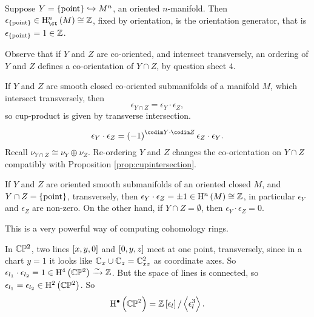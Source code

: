 \begin{example*}
Suppose $ Y = \pt \hookrightarrow M^n $, an oriented $ n $-manifold. Then $ \epsilon_{\pt} \in \Hc^n\br{M} \cong \ZZ $, fixed by orientation, is the orientation generator, that is $ \epsilon_{\pt} = 1 \in \ZZ $.
\end{example*}

Observe that if $ Y $ and $ Z $ are co-oriented, and intersect transversely, an ordering of $ Y $ and $ Z $ defines a co-orientation of $ Y \cap Z $, by question sheet $ 4 $.

\begin{proposition}
\label{prop:cupintersection}
If $ Y $ and $ Z $ are smooth closed co-oriented submanifolds of a manifold $ M $, which intersect transversely, then
$$ \epsilon_{Y \cap Z} = \epsilon_Y \cdot \epsilon_Z, $$
so cup-product is given by transverse intersection.
\end{proposition}

\begin{remark*}
$$ \epsilon_Y \cdot \epsilon_Z = \br{-1}^{\codim Y \cdot \codim Z}\epsilon_Z \cdot \epsilon_Y. $$
Recall $ \nu_{Y \cap Z} \cong \nu_Y \oplus \nu_Z $. Re-ordering $ Y $ and $ Z $ changes the co-orientation on $ Y \cap Z $ compatibly with Proposition \ref{prop:cupintersection}.
\end{remark*}

\begin{corollary}
If $ Y $ and $ Z $ are oriented smooth submanifolds of an oriented closed $ M $, and $ Y \cap Z = \pt $, transversely, then $ \epsilon_Y \cdot \epsilon_Z = \pm 1 \in \H^n\br{M} \cong \ZZ $, in particular $ \epsilon_Y $ and $ \epsilon_Z $ are non-zero. On the other hand, if $ Y \cap Z = \emptyset $, then $ \epsilon_Y \cdot \epsilon_Z = 0 $.
\end{corollary}

This is a very powerful way of computing cohomology rings.

\begin{example*}
In $ \mathbb{C}\mathbb{P}^2 $, two lines $ \sbr{x, y, 0} $ and $ \sbr{0, y, z} $ meet at one point, transversely, since in a chart $ y = 1 $ it looks like $ \mathbb{C}_x \cup \mathbb{C}_z = \mathbb{C}_{xz}^2 $ as coordinate axes. So $ \epsilon_{l_1} \cdot \epsilon_{l_2} = 1 \in \H^4\br{\CC\PP^2} \xrightarrow{\sim} \ZZ $. But the space of lines is connected, so $ \epsilon_{l_1} = \epsilon_{l_2} \in \H^2\br{\CC\PP^2} $. So
$$ \H^\bullet\br{\CC\PP^2} = \ZZ\sbr{\epsilon_l} / \abr{\epsilon_l^3}. $$
\end{example*}


